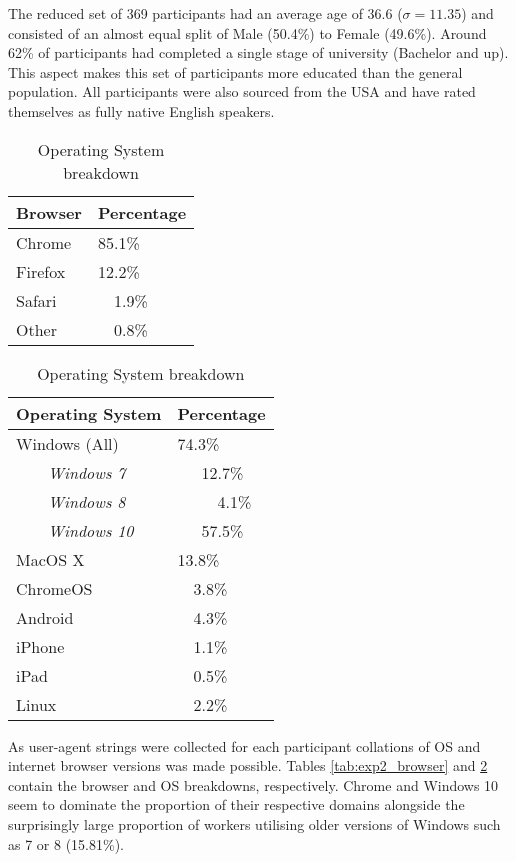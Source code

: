 The reduced set of 369 participants had an average age of 36.6 ($\sigma = 11.35$) and consisted of an almost equal split of Male (50.4\%) to Female (49.6\%). Around 62\% of participants had completed a single stage of university (Bachelor and up). This aspect makes this set of participants more educated than the general population. All participants were also sourced from the USA and have rated themselves as fully native English speakers.
\begin{table}[!h]
    \centering
    \begin{tabular}{|l|l|}
        \hline
        Browser & Percentage \\
        \hline
        Chrome & 85.1\% \\
        Firefox & 12.2\% \\
        Safari & ~~1.9\% \\
        Other & ~~0.8\% \\
        \hline
    \end{tabular}
    \caption{Internet Browser breakdown}
    \label{tab:exp2_browser}
    \begin{tabular}{|l|l|}
        \hline
        Operating System & Percentage \\
        \hline
        
        \hline
        Windows (All) & 74.3\% \\
        ~~~~\textit{Windows 7} & ~~~12.7\% \\
        ~~~~\textit{Windows 8} & ~~~~~4.1\% \\
        ~~~~\textit{Windows 10} & ~~~57.5\% \\
        MacOS X	 & 13.8\% \\
        ChromeOS & ~~3.8\% \\
        Android	& ~~4.3\% \\
        iPhone	& ~~1.1\% \\
        iPad	& ~~0.5\% \\
        Linux	& ~~2.2\% \\
        \hline
    \end{tabular}
    \caption{Operating System breakdown}
    \label{tab:exp2_os}
\end{table}
    
As user-agent strings were collected for each participant collations of OS and internet browser versions was made possible. Tables \ref{tab:exp2_browser} and \ref{tab:exp2_os} contain the browser and OS breakdowns,  respectively. Chrome and Windows 10 seem to dominate the proportion of their respective domains alongside the surprisingly large proportion of workers utilising older versions of Windows such as 7 or 8 (15.81\%).

